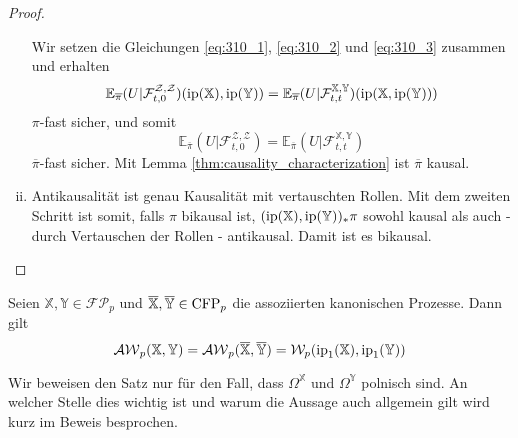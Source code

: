 \begin{proof}
\begin{enumerate}[(i)]
\begin{equation}
\end{equation}
Wir setzen die Gleichungen \ref{eq:310_1}, \ref{eq:310_2} und \ref{eq:310_3} zusammen und erhalten
$$\mathbb{E}_{\overline\pi}(U \vert \mathcal{F}_{t, 0}^{\mathcal{Z}, \mathcal{Z}})(\operatorname{ip}(\mathbb{X}), \operatorname{ip}(\mathbb{Y})) = \mathbb{E}_{\overline\pi}(U\vert \mathcal{F}_{t,t}^{\mathbb{X}, \mathbb{Y}})(\operatorname{ip}(\mathbb{X}, \operatorname{ip}(\mathbb{Y})))$$
$\pi$-fast sicher, und somit
$$\mathbb{E}_{\overline\pi}(U \vert \mathcal{F}_{t, 0}^{\mathcal{Z}, \mathcal{Z}}) = \mathbb{E}_{\overline\pi}(U\vert \mathcal{F}_{t,t}^{\mathbb{X}, \mathbb{Y}})$$
$\overline\pi$-fast sicher. Mit Lemma \ref{thm:causality_characterization} ist $\overline\pi$ kausal.
\item Antikausalität ist genau Kausalität mit vertauschten Rollen. Mit dem zweiten Schritt ist somit, falls $\pi$ bikausal ist, $(\operatorname{ip}(\mathbb{X}), \operatorname{ip}(\mathbb{Y}))_*\pi$ sowohl kausal als auch - durch Vertauschen der Rollen - antikausal. Damit ist es bikausal.
\end{enumerate}
\end{proof}
\begin{theorem}\label{thm:adapted_wasserstein_equalities}     
    Seien $\mathbb{X}, \mathbb{Y} \in \mathcal{FP}_p$ und $\overline{\mathbb{X}}, \overline{\mathbb{Y}} \in \operatorname{CFP}_p$ die assoziierten kanonischen Prozesse. Dann gilt
    $$\mathcal{AW}_p(\mathbb{X}, \mathbb{Y}) = \mathcal{AW}_p(\overline{\mathbb{X}}, \overline{\mathbb{Y}}) = \mathcal{W}_p(\operatorname{ip}_1(\mathbb{X}), \operatorname{ip}_1(\mathbb{Y}))$$
\end{theorem}
Wir beweisen den Satz nur für den Fall, dass $\Omega^\mathbb{X}$ und $\Omega^\mathbb{Y}$ polnisch sind. An welcher Stelle dies wichtig ist und warum die Aussage auch allgemein gilt wird kurz im Beweis besprochen.
